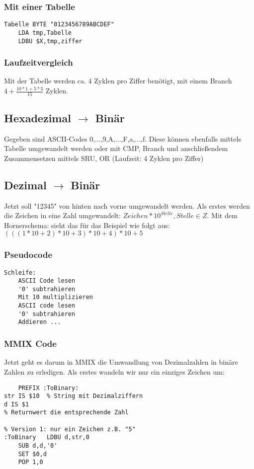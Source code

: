 \subsubsection{Mit einer Tabelle} 
\begin{lstlisting}
Tabelle BYTE "0123456789ABCDEF"
	LDA tmp,Tabelle
	LDBU $X,tmp,ziffer
\end{lstlisting}

\subsubsection{Laufzeitvergleich}
Mit der Tabelle werden ca. 4 Zyklen pro Ziffer benötigt, mit einem Branch $ 4 + \frac{10 * 1 + 5 * 3}{15} $ Zyklen.

\subsection{Hexadezimal $ \rightarrow $ Binär}
Gegeben sind ASCII-Codes 0,...,9,A,...,F,a,...,f. Diese können ebenfalls mittels Tabelle umgewandelt werden oder mit CMP, Branch und anschließendem Zusammensetzen mittels SRU, OR (Laufzeit: 4 Zyklen pro Ziffer)

\subsection{Dezimal $ \rightarrow $ Binär}
Jetzt soll "12345" von hinten nach vorne umgewandelt werden. Als erstes werden die Zeichen in eine Zahl umgewandelt: $ Zeichen * 10^{Stelle}, Stelle \in Z $. Mit dem Hornerschema: sieht das für das Beispiel wie folgt aus: $ (((1 * 10 + 2)* 10 + 3) * 10 + 4) * 10 + 5 $

\subsubsection{Pseudocode}
\begin{verbatim}
Schleife:
	ASCII Code lesen
	'0' subtrahieren
	Mit 10 multiplizieren
	ASCII code lesen
	'0' subtrahieren
	Addieren ...
\end{verbatim}
	
\subsubsection{MMIX Code}
Jetzt geht es darum in MMIX die Umwandlung von Dezimalzahlen in binäre Zahlen zu erledigen. Als erstes wandeln wir nur ein einziges Zeichen um:
\begin{lstlisting}
	PREFIX :ToBinary:
str IS $10	% String mit Dezimalziffern
d IS $1
% Returnwert die entsprechende Zahl

% Version 1: nur ein Zeichen z.B. "5"
:ToBinary	LDBU d,str,0
	SUB d,d,'0'
	SET $0,d
	POP 1,0
\end{lstlisting}

